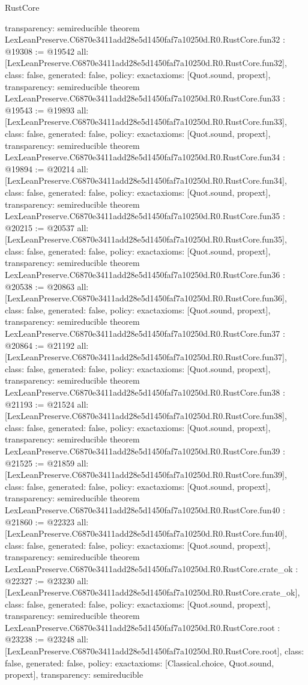 \begin{lexlean}{RustCore}
\begin{coremodule}
{  transparency: semireducible
}
theorem LexLeanPreserve.C6870e3411add28e5d1450faf7a10250d.R0.RustCore.fun32 : @19308 := @19542 {
  all: [LexLeanPreserve.C6870e3411add28e5d1450faf7a10250d.R0.RustCore.fun32],
  class: false,
  generated: false,
  policy: exact{axioms: [Quot.sound, propext]},
  transparency: semireducible
}
theorem LexLeanPreserve.C6870e3411add28e5d1450faf7a10250d.R0.RustCore.fun33 : @19543 := @19893 {
  all: [LexLeanPreserve.C6870e3411add28e5d1450faf7a10250d.R0.RustCore.fun33],
  class: false,
  generated: false,
  policy: exact{axioms: [Quot.sound, propext]},
  transparency: semireducible
}
theorem LexLeanPreserve.C6870e3411add28e5d1450faf7a10250d.R0.RustCore.fun34 : @19894 := @20214 {
  all: [LexLeanPreserve.C6870e3411add28e5d1450faf7a10250d.R0.RustCore.fun34],
  class: false,
  generated: false,
  policy: exact{axioms: [Quot.sound, propext]},
  transparency: semireducible
}
theorem LexLeanPreserve.C6870e3411add28e5d1450faf7a10250d.R0.RustCore.fun35 : @20215 := @20537 {
  all: [LexLeanPreserve.C6870e3411add28e5d1450faf7a10250d.R0.RustCore.fun35],
  class: false,
  generated: false,
  policy: exact{axioms: [Quot.sound, propext]},
  transparency: semireducible
}
theorem LexLeanPreserve.C6870e3411add28e5d1450faf7a10250d.R0.RustCore.fun36 : @20538 := @20863 {
  all: [LexLeanPreserve.C6870e3411add28e5d1450faf7a10250d.R0.RustCore.fun36],
  class: false,
  generated: false,
  policy: exact{axioms: [Quot.sound, propext]},
  transparency: semireducible
}
theorem LexLeanPreserve.C6870e3411add28e5d1450faf7a10250d.R0.RustCore.fun37 : @20864 := @21192 {
  all: [LexLeanPreserve.C6870e3411add28e5d1450faf7a10250d.R0.RustCore.fun37],
  class: false,
  generated: false,
  policy: exact{axioms: [Quot.sound, propext]},
  transparency: semireducible
}
theorem LexLeanPreserve.C6870e3411add28e5d1450faf7a10250d.R0.RustCore.fun38 : @21193 := @21524 {
  all: [LexLeanPreserve.C6870e3411add28e5d1450faf7a10250d.R0.RustCore.fun38],
  class: false,
  generated: false,
  policy: exact{axioms: [Quot.sound, propext]},
  transparency: semireducible
}
theorem LexLeanPreserve.C6870e3411add28e5d1450faf7a10250d.R0.RustCore.fun39 : @21525 := @21859 {
  all: [LexLeanPreserve.C6870e3411add28e5d1450faf7a10250d.R0.RustCore.fun39],
  class: false,
  generated: false,
  policy: exact{axioms: [Quot.sound, propext]},
  transparency: semireducible
}
theorem LexLeanPreserve.C6870e3411add28e5d1450faf7a10250d.R0.RustCore.fun40 : @21860 := @22323 {
  all: [LexLeanPreserve.C6870e3411add28e5d1450faf7a10250d.R0.RustCore.fun40],
  class: false,
  generated: false,
  policy: exact{axioms: [Quot.sound, propext]},
  transparency: semireducible
}
theorem LexLeanPreserve.C6870e3411add28e5d1450faf7a10250d.R0.RustCore.crate_ok : @22327 := @23230 {
  all: [LexLeanPreserve.C6870e3411add28e5d1450faf7a10250d.R0.RustCore.crate_ok],
  class: false,
  generated: false,
  policy: exact{axioms: [Quot.sound, propext]},
  transparency: semireducible
}
theorem LexLeanPreserve.C6870e3411add28e5d1450faf7a10250d.R0.RustCore.root : @23238 := @23248 {
  all: [LexLeanPreserve.C6870e3411add28e5d1450faf7a10250d.R0.RustCore.root],
  class: false,
  generated: false,
  policy: exact{axioms: [Classical.choice, Quot.sound, propext]},
  transparency: semireducible
}


\end{coremodule}
\end{lexlean}
